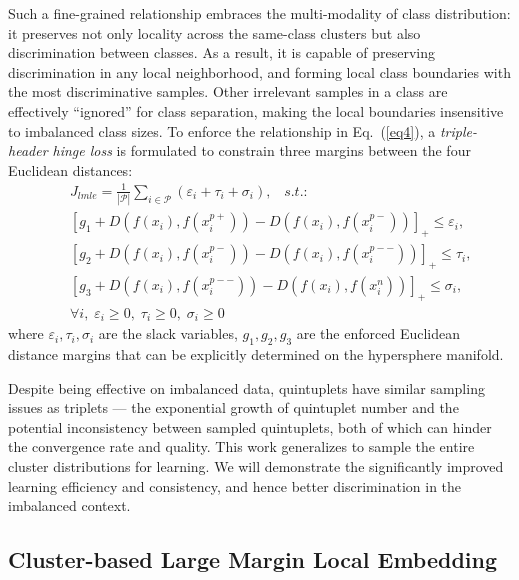 \documentclass[10pt,journal,compsoc]{IEEEtran}
\begin{document}
Such a fine-grained relationship embraces the multi-modality of class distribution: it preserves not only locality across the same-class clusters but also discrimination between classes. As a result, it is capable of preserving discrimination in any local neighborhood, and forming local class boundaries with the most discriminative samples. Other irrelevant samples in a class are effectively ``ignored'' for class separation, making the local boundaries insensitive to imbalanced class sizes. To enforce the relationship in Eq.~(\ref{eq4}), a \textit{triple-header hinge loss} is formulated to constrain three margins between the four Euclidean distances:
\begin{eqnarray}
\label{eq5}
  \!\!\!\!\!\!\!\!\!\!\!\!\!\! && J_{lmle}= \frac{1}{|\mathcal{P}|} \sum_{i \in \mathcal{P}} (\varepsilon_i+\tau_i+\sigma_i), \;\;\; s.t.: \nonumber\\
  \!\!\!\!\!\!\!\!\!\!\!\!\!\! && \left[ g_1+D(f(x_i),f(x_i^{p+}))-D(f(x_i),f(x_i^{p-}))\right]_+\leq \varepsilon_i, \nonumber\\
  \!\!\!\!\!\!\!\!\!\!\!\!\!\! && \left[ g_2+D(f(x_i),f(x_i^{p-}))-D(f(x_i),f(x_i^{p--}))\right]_+\leq \tau_i, \nonumber\\
  \!\!\!\!\!\!\!\!\!\!\!\!\!\! && \left[ g_3+D(f(x_i),f(x_i^{p--}))-D(f(x_i),f(x_i^{n}))\right]_+\leq \sigma_i, \nonumber\\
  \!\!\!\!\!\!\!\!\!\!\!\!\!\! && \forall i, \; \varepsilon_i \geq 0, \; \tau_i \geq 0, \; \sigma_i \geq 0
\end{eqnarray}
where $\varepsilon_i,\tau_i,\sigma_i$ are the slack variables, $g_1,g_2,g_3$ are the enforced Euclidean distance margins that can be explicitly determined on the hypersphere manifold.

Despite being effective on imbalanced data, quintuplets have similar sampling issues as triplets --- the exponential growth of quintuplet number and the potential inconsistency between sampled quintuplets, both of which can hinder the convergence rate and quality. This work generalizes to sample the entire cluster distributions for learning. We will demonstrate the significantly improved learning efficiency and consistency, and hence better discrimination in the imbalanced context.

\subsection{Cluster-based Large Margin Local Embedding}
\end{document}
